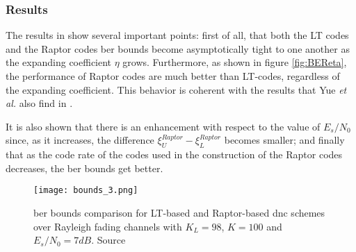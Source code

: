 \subsubsection{Results}
The results in \cite{Yue2013} show several important points: first of all, that both the LT codes and the Raptor codes \gls{ber} bounds become asymptotically tight to one another as the expanding coefficient $\eta$ grows. Furthermore, as shown in figure \autoref{fig:BEReta}, the performance of Raptor codes are much better than LT-codes, regardless of the expanding coefficient. This behavior is coherent with the results that Yue \textit{et al.} also find in \cite{Yue2014}.

It is also shown that there is an enhancement with respect to the value of $E_s/N_0$ since, as it increases, the difference $\xi_U^{Raptor}-\xi_L^{Raptor}$ becomes smaller; and finally that as the code rate of the codes used in the construction of the Raptor codes decreases, the \gls{ber} bounds get better.
\begin{SCfigure}
  \texttt{[image: bounds\_3.png]}
  \caption{\gls{ber} bounds comparison for LT-based and Raptor-based \gls{dnc} schemes over Rayleigh fading channels with $K_L = 98$, $K = 100$ and $E_s/N_0 = 7dB$. Source \cite{Yue2013}}
  \label{fig:BEReta}
\end{SCfigure}

